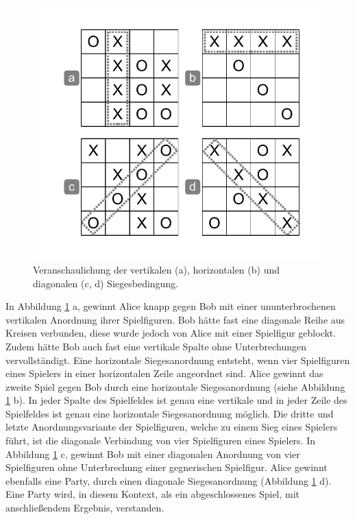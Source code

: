\begin{figure}[!htbp]
  \centering
  \includegraphics[scale = 1]{inhalt/abbildungen/siegesbedingungen_tictactoe.pdf}
  \caption{Veranschaulichung der vertikalen (a), horizontalen (b) und diagonalen (c, d) Siegesbedingung.}
  \label{fig:siegesbedingungen_tictactoe}
\end{figure}

In Abbildung \ref{fig:siegesbedingungen_tictactoe} a, gewinnt Alice knapp gegen Bob mit einer ununterbrochenen vertikalen Anordnung ihrer Spielfiguren. Bob hätte fast eine diagonale Reihe aus Kreisen verbunden, diese wurde jedoch von Alice mit einer Spielfigur geblockt. Zudem hätte Bob auch fast eine vertikale Spalte ohne Unterbrechungen vervollständigt. Eine horizontale Siegesanordnung entsteht, wenn vier Spielfiguren eines Spielers in einer horizontalen Zeile angeordnet sind. Alice gewinnt das zweite Spiel gegen Bob durch eine horizontale Siegesanordnung (siehe Abbildung \ref{fig:siegesbedingungen_tictactoe} b). In jeder Spalte des Spielfeldes ist genau eine vertikale und in jeder Zeile des Spielfeldes ist genau eine horizontale Siegesanordnung möglich. Die dritte und letzte Anordnungsvariante der Spielfiguren, welche zu einem Sieg eines Spielers führt, ist die diagonale Verbindung von vier Spielfiguren eines Spielers. In Abbildung  \ref{fig:siegesbedingungen_tictactoe} c, gewinnt Bob mit einer diagonalen Anordnung von vier Spielfiguren ohne Unterbrechung einer gegnerischen Spielfigur. Alice gewinnt ebenfalls eine Party, durch einen diagonale Siegesanordnung (Abbildung \ref{fig:siegesbedingungen_tictactoe} d). Eine Party wird, in diesem Kontext, als ein abgeschlossenes Spiel, mit anschließendem Ergebnis, verstanden. \\

